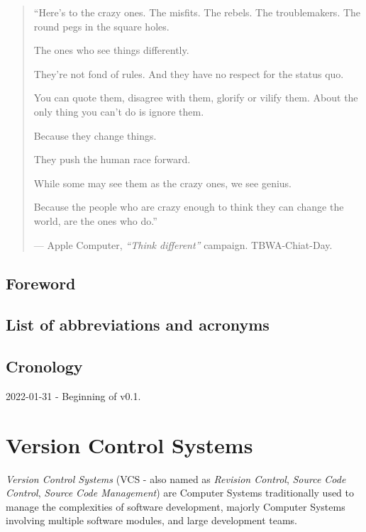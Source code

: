 \documentclass[
]{book}
\begin{document}
\begin{quote}
``Here's to the crazy ones.
The misfits.
The rebels.
The troublemakers.
The round pegs in the square holes.

The ones who see things differently.

They're not fond of rules.
And they have no respect for the status quo.

You can quote them, disagree with them, glorify or vilify them.
About the only thing you can't do is ignore them.

Because they change things.

They push the human race forward.

While some may see them as the crazy ones,
we see genius.

Because the people who are crazy enough to think
they can change the world, are the ones who do.''

--- Apple Computer, \emph{``Think different''} campaign. TBWA-Chiat-Day.
\end{quote}

\hypertarget{foreword}{%
\section{Foreword}\label{foreword}}

\hypertarget{list-of-abbreviations-and-acronyms}{%
\section{List of abbreviations and acronyms}\label{list-of-abbreviations-and-acronyms}}

\hypertarget{cronology}{%
\section{Cronology}\label{cronology}}

2022-01-31 - Beginning of v0.1.

\hypertarget{version-control-systems}{%
\chapter{Version Control Systems}\label{version-control-systems}}

\emph{Version Control Systems} \citet{wiki_version_control} (VCS - also named as \emph{Revision Control},
\emph{Source Code Control}, \emph{Source Code Management}) are Computer Systems
traditionally used to manage the complexities of software development, majorly
Computer Systems involving multiple software modules, and large development teams.
\end{document}
